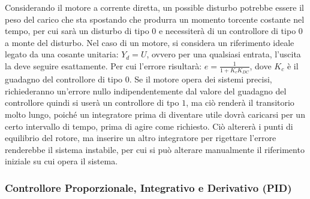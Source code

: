 \documentclass{article}
\numberwithin{equation}{subsection}
\begin{document}
Considerando il motore a corrente diretta, un possible disturbo potrebbe essere il peso del carico che sta spostando che produrra un momento torcente costante nel tempo, 
per cui sarà un disturbo di tipo $0$ e necessiterà di un controllore di tipo $0$ a monte del disturbo. Nel caso di un motore, si considera un riferimento ideale legato da 
una cosante unitaria: $Y_d=U$, ovvero per una qualsiasi entrata, l'uscita la deve seguire esattamente. Per cui l'errore risultarà: $e=\displaystyle\frac{1}{1+K_cK_{DC}}$, 
dove $K_c$ è il guadagno del controllore di tipo $0$. Se il motore opera dei sistemi precisi, richiederanno un'errore nullo 
indipendentemente dal valore del guadagno del controllore quindi si userà un controllore di tpo $1$, ma ciò renderà il transitorio molto lungo, poiché un integratore 
prima di diventare utile dovrà caricarsi per un certo intervallo di tempo, prima di agire come richiesto. Ciò altererà i punti di equilibrio del rotore, ma inserire un 
altro integratore per rigettare l'errore renderebbe il sistema instabile, per cui si può alterare manualmente il riferimento iniziale su cui opera il sistema. 

\begin{center}\end{center}

\subsubsection{Controllore Proporzionale, Integrativo e Derivativo (PID)}
\end{document}
